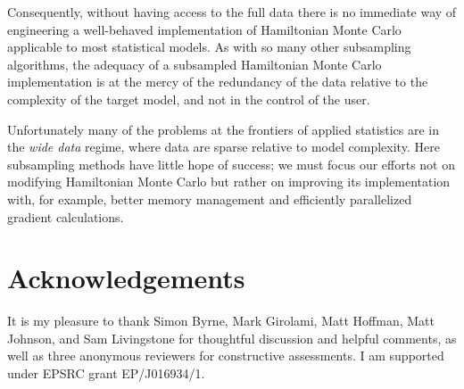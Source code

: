 \documentclass{article}
\begin{document}
Consequently, without having access to the full data there is no immediate way of 
engineering a well-behaved implementation of Hamiltonian Monte Carlo applicable
to most statistical models.  As with so many other subsampling algorithms, the 
adequacy of a subsampled Hamiltonian Monte Carlo implementation is at the mercy 
of the redundancy of the data relative to the complexity of the target model, and not 
in the control of the user.

Unfortunately many of the problems at the frontiers of applied statistics are 
in the \textit{wide data} regime, where data are sparse relative to model 
complexity.  Here subsampling methods have little hope of success;
we must focus our efforts not on modifying Hamiltonian Monte Carlo but rather
on improving its implementation with, for example, better memory management 
and efficiently parallelized gradient calculations.

\section*{Acknowledgements}

It is my pleasure to thank Simon Byrne, Mark Girolami, Matt Hoffman, 
Matt Johnson, and Sam Livingstone for thoughtful discussion and helpful 
comments, as well as three anonymous reviewers for constructive
assessments.  I am supported under EPSRC grant EP/J016934/1.



\end{document}
